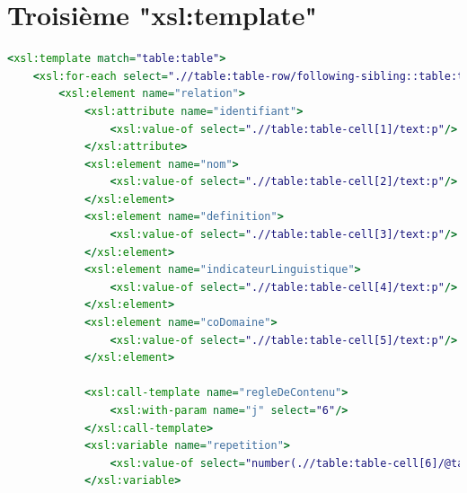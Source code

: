 \documentclass[11pt]{report}
\begin{document}
\section{Troisième "xsl:template"}
\begin{lstlisting}[language=XSLT]
<xsl:template match="table:table">
    <xsl:for-each select=".//table:table-row/following-sibling::table:table-row[1]">
        <xsl:element name="relation">
            <xsl:attribute name="identifiant">
                <xsl:value-of select=".//table:table-cell[1]/text:p"/>
            </xsl:attribute>
            <xsl:element name="nom">
                <xsl:value-of select=".//table:table-cell[2]/text:p"/>
            </xsl:element>
            <xsl:element name="definition">
                <xsl:value-of select=".//table:table-cell[3]/text:p"/>
            </xsl:element>
            <xsl:element name="indicateurLinguistique">
                <xsl:value-of select=".//table:table-cell[4]/text:p"/>
            </xsl:element>
            <xsl:element name="coDomaine">
                <xsl:value-of select=".//table:table-cell[5]/text:p"/>
            </xsl:element>
            
            <xsl:call-template name="regleDeContenu">
                <xsl:with-param name="j" select="6"/>
            </xsl:call-template>
            <xsl:variable name="repetition">
                <xsl:value-of select="number(.//table:table-cell[6]/@table:number-columns-repeated)"/>
            </xsl:variable>


\end{lstlisting}
\end{document}
